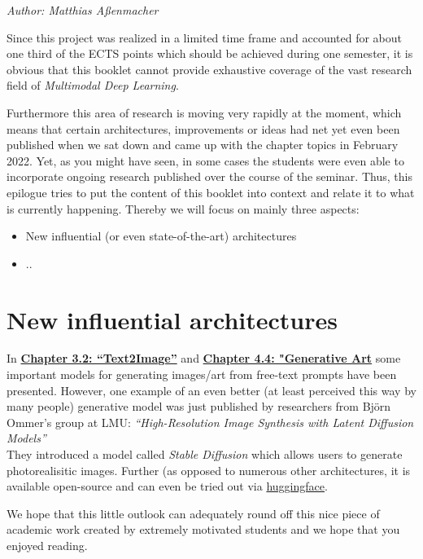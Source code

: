 \documentclass[
]{krantz}
\providecommand{\tightlist}{%
  \setlength{\itemsep}{0pt}\setlength{\parskip}{0pt}}
\begin{document}
\emph{Author: Matthias Aßenmacher}

Since this project was realized in a limited time frame and accounted for about one third
of the ECTS points which should be achieved during one semester, it is obvious that this
booklet cannot provide exhaustive coverage of the vast research field of \emph{Multimodal Deep Learning}.

Furthermore this area of research is moving very rapidly at the moment, which means that
certain architectures, improvements or ideas had net yet even been published when we sat down
and came up with the chapter topics in February 2022. Yet, as you might have seen, in some cases the
students were even able to incorporate ongoing research published over the course of the seminar.
Thus, this epilogue tries to put the content of this booklet into context and relate it to what is
currently happening. Thereby we will focus on mainly three aspects:

\begin{itemize}
\tightlist
\item
  New influential (or even state-of-the-art) architectures
\item
  ..
\end{itemize}

\hypertarget{new-influential-architectures}{%
\section{New influential architectures}\label{new-influential-architectures}}

In \href{./c02-00-multimodal.html\#c02-02-text2img}{\textbf{Chapter 3.2: ``Text2Image''}} and \href{./c03-00-further.html\#c03-04-usecase}{\textbf{Chapter 4.4: "Generative Art}} some important models for generating images/art from free-text prompts have been presented. However, one example of an even better (at least perceived this way by many people) generative model was just published by researchers from Björn Ommer's group at LMU: \emph{``High-Resolution Image Synthesis with Latent Diffusion Models''}\\
They introduced a model called \emph{Stable Diffusion} which allows users to generate photorealisitic images. Further (as opposed to numerous other architectures, it is available open-source and can even be tried out via \href{https://huggingface.co/spaces/stabilityai/stable-diffusion}{huggingface}.

We hope that this little outlook can adequately round off this nice piece of academic work created by extremely motivated students and we hope that you enjoyed reading.
\end{document}
